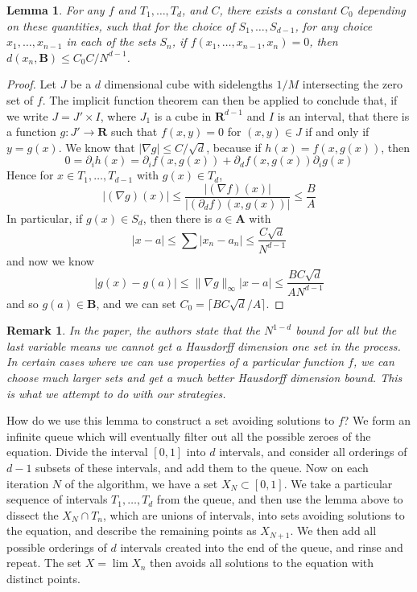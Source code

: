 \documentclass{report}
\theoremstyle{plain}
\newtheorem{lemma}{Lemma}
\theoremstyle{plain}
\newtheorem*{remark}{Remark}
\begin{document}
\begin{lemma}
    For any $f$ and $T_1, \dots, T_d$, and $C$, there exists a constant $C_0$ depending on these quantities, such that for the choice of $S_1, \dots, S_{d-1}$, for any choice $x_1, \dots, x_{n-1}$ in each of the sets $S_n$, if $f(x_1, \dots, x_{n-1}, x_n) = 0$, then $d(x_n, \mathbf{B}) \leq C_0C/N^{d-1}$.
\end{lemma}
\begin{proof}
    Let $J$ be a $d$ dimensional cube with sidelengths $1/M$ intersecting the zero set of $f$. The implicit function theorem can then be applied to conclude that, if we write $J = J' \times I$, where $J_1$ is a cube in $\mathbf{R}^{d-1}$ and $I$ is an interval, that there is a function $g: J' \to \mathbf{R}$ such that $f(x,y) = 0$ for $(x,y) \in J$ if and only if $y = g(x)$. We know that $|\nabla g| \leq C/\sqrt{d}$, because if $h(x) = f(x,g(x))$, then
    \[ 0 = \partial_i h(x) = \partial_i f (x,g(x)) + \partial_d f (x, g(x)) \partial_i g(x) \]
    Hence for $x \in T_1, \dots, T_{d-1}$ with $g(x) \in T_d$,
    \[ |(\nabla g)(x)| \leq \frac{|(\nabla f)(x)|}{|(\partial_d f)(x,g(x))|} \leq \frac{B}{A} \]
    In particular, if $g(x) \in S_d$, then there is $a \in \mathbf{A}$ with
    \[ |x-a| \leq \sum |x_n - a_n| \leq \frac{C \sqrt{d}}{N^{d-1}} \]
    and now we know
    \[ |g(x) - g(a)| \leq \| \nabla g \|_\infty |x - a| \leq \frac{BC \sqrt{d}}{A N^{d-1}} \]
    and so $g(a) \in \mathbf{B}$, and we can set $C_0 = \lceil BC \sqrt{d}/A \rceil$.
\end{proof}

\begin{remark}
    In the paper, the authors state that the $N^{1-d}$ bound for all but the last variable means we cannot get a Hausdorff dimension one set in the process. In certain cases where we can use properties of a particular function $f$, we can choose much larger sets and get a much better Hausdorff dimension bound. This is what we attempt to do with our strategies.
\end{remark}

How do we use this lemma to construct a set avoiding solutions to $f$? We form an infinite queue which will eventually filter out all the possible zeroes of the equation. Divide the interval $[0,1]$ into $d$ intervals, and consider all orderings of $d - 1$ subsets of these intervals, and add them to the queue. Now on each iteration $N$ of the algorithm, we have a set $X_N \subset [0,1]$. We take a particular sequence of intervals $T_1, \dots, T_d$ from the queue, and then use the lemma above to dissect the $X_N \cap T_n$, which are unions of intervals, into sets avoiding solutions to the equation, and describe the remaining points as $X_{N+1}$. We then add all possible orderings of $d$ intervals created into the end of the queue, and rinse and repeat. The set $X = \lim X_n$ then avoids all solutions to the equation with distinct points.
\end{document}
